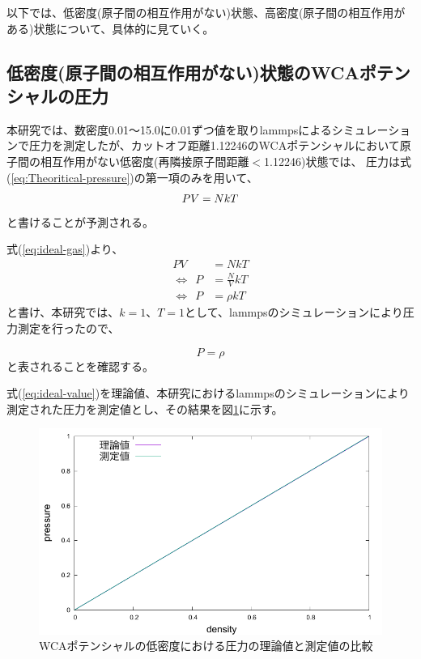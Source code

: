 \documentclass[titlepage]{jsreport}
\begin{document}
以下では、低密度(原子間の相互作用がない)状態、高密度(原子間の相互作用がある)状態について、具体的に見ていく。

\newpage
\subsection{低密度(原子間の相互作用がない)状態のWCAポテンシャルの圧力}\label{results-sec:WCA-press-low-density}
本研究では、数密度0.01〜15.0に0.01ずつ値を取りlammpsによるシミュレーションで圧力を測定したが、カットオフ距離1.12246のWCAポテンシャルにおいて原子間の相互作用がない低密度(再隣接原子間距離$<$1.12246)状態では、
圧力は式(\ref{eq:Theoritical-pressure})の第一項のみを用いて、
\large
\begin{equation}
PV=NkT{\label{eq:ideal-gas}}
\end{equation}
\normalsize
と書けることが予測される。


式(\ref{eq:ideal-gas})より、
\large
\begin{eqnarray}
PV&=NkT\nonumber\\
{\Leftrightarrow}{\ }{\ }P&={\frac{N}{V}}kT\nonumber\\
{\Leftrightarrow}{\ }{\ }P&={\rho}kT\nonumber
\end{eqnarray}
\normalsize
と書け、本研究では、$k=1$、$T=1$として、lammpsのシミュレーションにより圧力測定を行ったので、

\large
\begin{equation}
P={\rho} \label{eq:ideal-value}
\end{equation}
\normalsize
と表されることを確認する。

式(\ref{eq:ideal-value})を理論値、本研究におけるlammpsのシミュレーションにより測定された圧力を測定値とし、その結果を図\ref{fig:lowden_compare:den-pre}に示す。

\begin{figure}[htbp]
    \begin{center}
        \includegraphics[width=14cm]{fig/lowden_compare:den-pre.pdf}
    \end{center}
    \caption{WCAポテンシャルの低密度における圧力の理論値と測定値の比較}
    \label{fig:lowden_compare:den-pre}
\end{figure}
\end{document}
